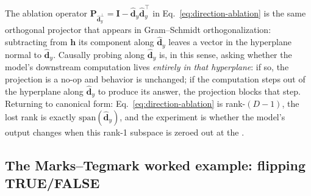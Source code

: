\begin{intuition}
The ablation operator
$\mathbf{P}_{\hat{\mathbf{d}}_y^{\perp}} = \mathbf{I} -
\hat{\mathbf{d}}_y \hat{\mathbf{d}}_y^{\top}$ in
Eq.~\eqref{eq:direction-ablation} is the same orthogonal projector
that appears in Gram--Schmidt orthogonalization: subtracting from
$\mathbf{h}$ its component along $\hat{\mathbf{d}}_y$ leaves a vector
in the hyperplane normal to $\hat{\mathbf{d}}_y$. Causally probing
along $\hat{\mathbf{d}}_y$ is, in this sense, asking whether the
model's downstream computation lives \emph{entirely in that
hyperplane}: if so, the projection is a no-op and behavior is
unchanged; if the computation steps out of the hyperplane along
$\hat{\mathbf{d}}_y$ to produce its answer, the projection blocks
that step. Returning to canonical form: Eq.~\eqref{eq:direction-ablation}
is rank-$(D-1)$, the lost rank is exactly $\mathrm{span}(\hat{\mathbf{d}}_y)$,
and the experiment is whether the model's output changes when this
rank-1 subspace is zeroed out at the .
\end{intuition}

\subsection{The Marks--Tegmark worked example: flipping TRUE/FALSE}
\label{sec:mt-worked-example}

